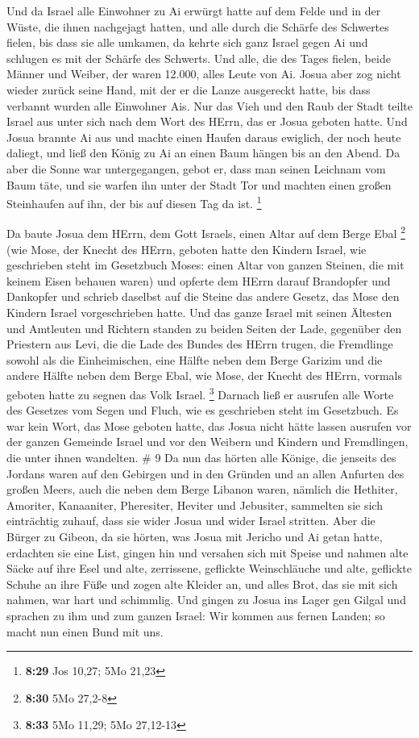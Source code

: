  Und da Israel alle Einwohner zu Ai erwürgt hatte auf dem
Felde und in der Wüste, die ihnen nachgejagt hatten, und alle durch die
Schärfe des Schwertes fielen, bis dass sie alle umkamen, da kehrte sich
ganz Israel gegen Ai und schlugen es mit der Schärfe des Schwerts.
 Und alle, die des Tages fielen, beide Männer und Weiber,
der waren 12.000, alles Leute von Ai.  Josua aber zog nicht
wieder zurück seine Hand, mit der er die Lanze ausgereckt hatte, bis
dass verbannt wurden alle Einwohner Ais.  Nur das Vieh und
den Raub der Stadt teilte Israel aus unter sich nach dem Wort des HErrn,
das er Josua geboten hatte.  Und Josua brannte Ai aus und
machte einen Haufen daraus ewiglich, der noch heute daliegt,
 und ließ den König zu Ai an einen Baum hängen bis an den
Abend. Da aber die Sonne war untergegangen, gebot er, dass man seinen
Leichnam vom Baum täte, und sie warfen ihn unter der Stadt Tor und
machten einen großen Steinhaufen auf ihn, der bis auf diesen Tag da ist.
\footnote{\textbf{8:29} Jos 10,27; 5Mo 21,23}

 Da baute Josua dem HErrn, dem Gott Israels, einen Altar
auf dem Berge Ebal \footnote{\textbf{8:30} 5Mo 27,2-8} 
(wie Mose, der Knecht des HErrn, geboten hatte den Kindern Israel, wie
geschrieben steht im Gesetzbuch Moses: einen Altar von ganzen Steinen,
die mit keinem Eisen behauen waren) und opferte dem HErrn darauf
Brandopfer und Dankopfer  und schrieb daselbst auf die
Steine das andere Gesetz, das Mose den Kindern Israel vorgeschrieben
hatte.  Und das ganze Israel mit seinen Ältesten und
Amtleuten und Richtern standen zu beiden Seiten der Lade, gegenüber den
Priestern aus Levi, die die Lade des Bundes des HErrn trugen, die
Fremdlinge sowohl als die Einheimischen, eine Hälfte neben dem Berge
Garizim und die andere Hälfte neben dem Berge Ebal, wie Mose, der Knecht
des HErrn, vormals geboten hatte zu segnen das Volk Israel. \footnote{\textbf{8:33}
  5Mo 11,29; 5Mo 27,12-13}  Darnach ließ er ausrufen alle
Worte des Gesetzes vom Segen und Fluch, wie es geschrieben steht im
Gesetzbuch.  Es war kein Wort, das Mose geboten hatte, das
Josua nicht hätte lassen ausrufen vor der ganzen Gemeinde Israel und vor
den Weibern und Kindern und Fremdlingen, die unter ihnen wandelten. \# 9
 Da nun das hörten alle Könige, die jenseits des Jordans
waren auf den Gebirgen und in den Gründen und an allen Anfurten des
großen Meers, auch die neben dem Berge Libanon waren, nämlich die
Hethiter, Amoriter, Kanaaniter, Pheresiter, Heviter und Jebusiter,
 sammelten sie sich einträchtig zuhauf, dass sie wider Josua
und wider Israel stritten.  Aber die Bürger zu Gibeon, da
sie hörten, was Josua mit Jericho und Ai getan hatte, erdachten sie eine
List,  gingen hin und versahen sich mit Speise und nahmen
alte Säcke auf ihre Esel  und alte, zerrissene, geflickte
Weinschläuche und alte, geflickte Schuhe an ihre Füße und zogen alte
Kleider an, und alles Brot, das sie mit sich nahmen, war hart und
schimmlig.  Und gingen zu Josua ins Lager gen Gilgal und
sprachen zu ihm und zum ganzen Israel: Wir kommen aus fernen Landen; so
macht nun einen Bund mit uns.

